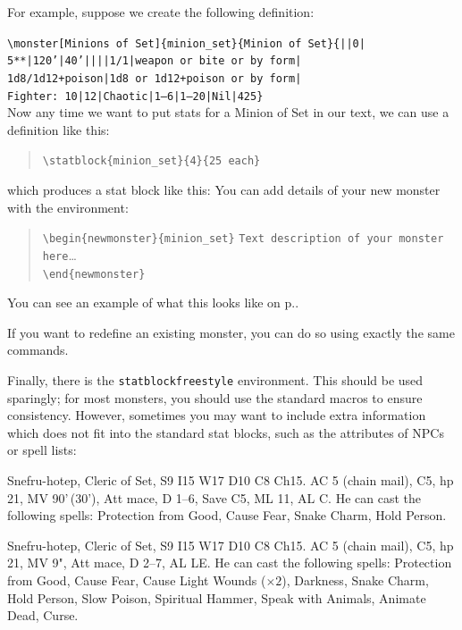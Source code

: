 \documentclass[letterpaper,serif]{module}
\begin{document}
\noindent For example, suppose we create the following definition:\\[0.1em]


\noindent\texttt{\textbackslash monster[Minions~of~Set]\{minion\_set\}\{Minion~of~Set\}\{||0|
5**|120'|40'||||1/1|weapon~or~bite~or~by~form|
1d8/1d12+poison|1d8~or~1d12+poison~or~by~form|
Fighter:~10|12|Chaotic|1--6|1--20|Nil|425\}}\\[0.1em]

\noindent Now any time we want to put stats for a Minion of Set in our text, we can use a definition like this:
\begin{quote}
\verb|\statblock{minion_set}{4}{25 each}|
\end{quote}
which produces a stat block like this:
You can add details of your new monster with the environment:
\begin{quote}
\verb|\begin{newmonster}{minion_set}|
\verb|Text description of your monster here|\ldots\\
\verb|\end{newmonster}|
\end{quote}
You can see an example of what this looks like on p.\pageref{minion_set}.

If you want to redefine an existing monster, you can do so using exactly the same commands.

Finally, there is the \verb|statblockfreestyle| environment. This should be used sparingly; for most monsters, you should use
the standard macros to ensure consistency. However, sometimes you may want to include extra information which does not
fit into the standard stat blocks, such as the attributes of NPCs or spell lists:



\begin{statblockfreestyle}
\begin{ifbasicstats}
Snefru-hotep, Cleric of Set, S9 I15 W17 D10 C8 Ch15. AC 5 (chain mail), C5, hp 21, MV 90'\,(30'), Att mace, D 1--6, Save C5, ML 11, AL C.
He can cast the following spells: Protection from Good, Cause Fear, Snake Charm, Hold Person.
\end{ifbasicstats}
\begin{ifadvancedstats}
Snefru-hotep, Cleric of Set, S9 I15 W17 D10 C8 Ch15. AC 5 (chain mail), C5, hp 21, MV 9", Att mace, D 2--7, AL LE.
He can cast the following spells: Protection from Good, Cause Fear, Cause Light Wounds ($\times 2$), Darkness,
Snake Charm, Hold Person, Slow Poison, Spiritual Hammer, Speak with Animals, Animate Dead, Curse.
\end{ifadvancedstats}
\end{statblockfreestyle}
\end{document}
